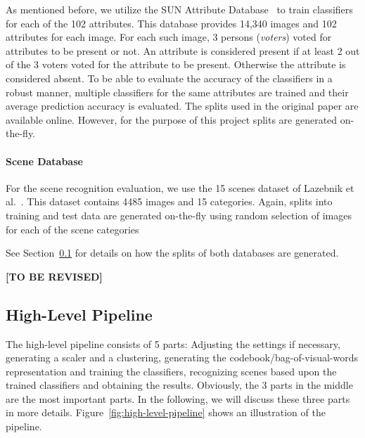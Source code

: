 \documentclass{vldb}
\newcommand{\tbr}{{\color{red}\textbf{[TO BE REVISED]}}}
\begin{document}
As mentioned before, we utilize the SUN Attribute Database~\cite{Patterson:2012}
to train classifiers for each of the 102 attributes. This database provides
14,340 images and 102 attributes for each image. For each such image, 3 persons
(\emph{voters}) voted for attributes to be present or not. An attribute is
considered present if at least 2 out of the 3 voters voted for the attribute to
be present. Otherwise the attribute is considered absent. To be able to evaluate
the accuracy of the classifiers in a robust manner, multiple classifiers for the
same attributes are trained and their average prediction accuracy is evaluated.
The splits used in the original paper are available online. However, for the
purpose of this project splits are generated on-the-fly.

\paragraph*{Scene Database}
\label{par:scene-database}

For the scene recognition evaluation, we use the 15 scenes dataset of Lazebnik
et al.~\cite{Lazebnik:2006}. This dataset contains 4485 images and 15 categories.
Again, splits into training and test data are generated on-the-fly using random
selection of images for each of the scene categories

See Section~\ref{subsec:high-level-pipeline} for details on how the splits of
both databases are generated.

\tbr

\subsection{High-Level Pipeline}
\label{subsec:high-level-pipeline}

The high-level pipeline consists of 5 parts: Adjusting the settings if necessary,
generating a scaler and a clustering, generating the codebook/bag-of-visual-words
representation and training the classifiers, recognizing scenes based upon the
trained classifiers and obtaining the results. Obviously, the 3 parts in the
middle are the most important parts. In the following, we will discuss these three
parts in more details. Figure~\ref{fig:high-level-pipeline} shows an illustration
of the pipeline.
\end{document}
